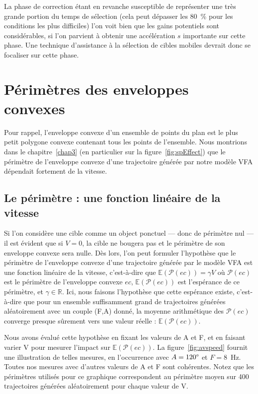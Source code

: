 	La phase de correction étant en revanche susceptible de représenter une très grande portion du temps de sélection (cela peut dépasser les 80~\%{} pour les conditions les plus difficiles) l'on voit bien que les gains potentiels sont considérables, si l'on parvient à obtenir une accélération $s$ importante sur cette phase. Une technique d'assistance à la sélection de cibles mobiles devrait donc se focaliser sur cette phase.
	
\section{Périmètres des enveloppes convexes}
	Pour rappel, l'enveloppe convexe d'un ensemble de points du plan est le plus petit polygone convexe contenant tous les points de l'ensemble. Nous montrions dans le chapitre~\ref{chap3} (en particulier sur la figure~\ref{fig:spEffect}) que le périmètre de l'enveloppe convexe d'une trajectoire générée par notre modèle VFA dépendait fortement de la vitesse.
	
	\subsection{Le périmètre : une fonction linéaire de la vitesse}
	Si l'on considère une cible comme un object ponctuel --- donc de périmètre nul --- il est évident que si $V = 0$, la cible ne bougera pas et le périmètre de son enveloppe convexe sera nulle. Dès lors, l'on peut formuler l'hypothèse que le périmètre de l'enveloppe convexe d'une trajectoire générée par le modèle VFA est une fonction linéaire de la vitesse, c'est-à-dire que $\mathbb{E}(\mathcal{P}(ec)) = \gamma{}V$ où $\mathcal{P}(ec)$ est le périmètre de l'enveloppe convexe $ec$, $\mathbb{E}(\mathcal{P}(ec))$ est l'espérance de ce périmètre, et $\gamma \in \mathbb{R}$. Ici, nous faisons l'hypothèse que cette espérance existe, c'est-à-dire que pour un ensemble suffisamment grand de trajectoires générées aléatoirement avec un couple (F,A) donné, la moyenne arithmétique des $\mathcal{P}(ec)$ converge presque sûrement vers une valeur réelle : $\mathbb{E}(\mathcal{P}(ec))$.
	
	Nous avons évalué cette hypothèse en fixant les valeurs de A et F, et en faisant varier V pour mesurer l'impact sur $\mathbb{E}(\mathcal{P}(ec))$. La figure~\ref{fig:avspeed} fournit une illustration de telles mesures, en l'occurrence avec $A = 120\degree$ et $F = 8$~Hz. Toutes nos mesures avec d'autres valeurs de A et F sont cohérentes. Notez que les périmètres utilisés pour ce graphique correspondent au périmètre moyen sur 400 trajectoires générées aléatoirement pour chaque valeur de V.
	
